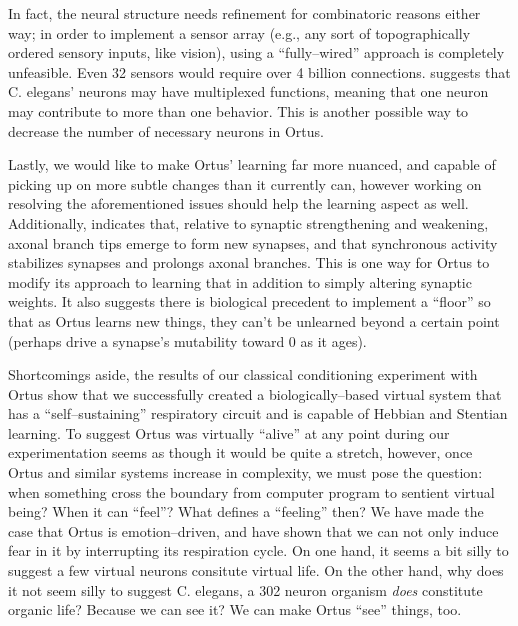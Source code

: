 \documentclass[letterpaper]{article}
\begin{document}
In fact, the neural structure needs refinement for combinatoric reasons either way; in order to implement a sensor array (e.g., any sort of topographically ordered sensory inputs, like vision), using a ``fully--wired'' approach is completely unfeasible. Even 32 sensors would require over 4 billion connections. \citet{Schroter2017} suggests that C. elegans' neurons may have multiplexed functions, meaning that one neuron may contribute to more than one behavior. This is another possible way to decrease the number of necessary neurons in Ortus.


Lastly, we would like to make Ortus' learning far more nuanced, and capable of picking up on more subtle changes than it currently can, however working on resolving the aforementioned issues should help the learning aspect as well. Additionally, \citet{Kutsarova2016} indicates that, relative to synaptic strengthening and weakening, axonal branch tips emerge to form new synapses, and that synchronous activity stabilizes synapses and prolongs axonal branches. This is one way for Ortus to modify its approach to learning that in addition to simply altering synaptic weights. It also suggests there is biological precedent to implement a ``floor'' so that as Ortus learns new things, they can't be unlearned beyond a certain point (perhaps drive a synapse's mutability toward 0 as it ages). 



Shortcomings aside, the results of our classical conditioning experiment with Ortus show that we successfully created a biologically--based virtual system that has a ``self--sustaining'' respiratory circuit and is capable of Hebbian and Stentian learning. To suggest Ortus was virtually ``alive'' at any point during our experimentation seems as though it would be quite a stretch, however, once Ortus and similar systems increase in complexity, we must pose the question: when something cross the boundary from computer program to sentient virtual being? When it can ``feel''? What defines a ``feeling'' then? We have made the case that Ortus is emotion--driven, and have shown that we can not only induce fear in it by interrupting its respiration cycle. On one hand, it seems a bit silly to suggest a few virtual neurons consitute virtual life. On the other hand, why does it not seem silly to suggest C. elegans, a 302 neuron organism \textit{does} constitute organic life? Because we can see it? We can make Ortus ``see'' things, too.
\end{document}
